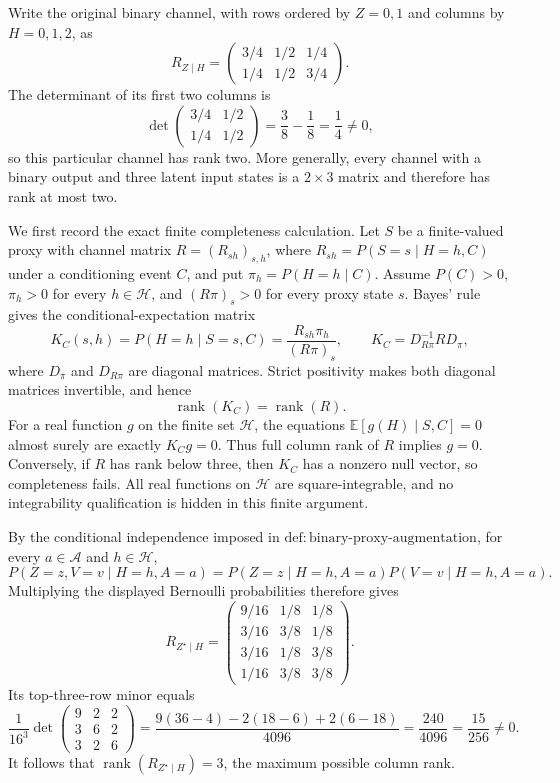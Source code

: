 Write the original binary channel, with rows ordered by \(Z=0,1\) and columns by \(H=0,1,2\), as
\[
 R_{Z\mid H}=
 \begin{pmatrix}
  3/4&1/2&1/4\\
  1/4&1/2&3/4
 \end{pmatrix}.
\]
The determinant of its first two columns is
\[
 \det\!\begin{pmatrix}3/4&1/2\\1/4&1/2\end{pmatrix}
 =\frac{3}{8}-\frac{1}{8}=\frac14\ne0,
\]
so this particular channel has rank two. More generally, every channel with a binary output and three latent input states is a \(2\times3\) matrix and therefore has rank at most two.

We first record the exact finite completeness calculation. Let \(S\) be a finite-valued proxy with channel matrix \(R=(R_{sh})_{s,h}\), where \(R_{sh}=P(S=s\mid H=h,C)\) under a conditioning event \(C\), and put \(\pi_h=P(H=h\mid C)\). Assume \(P(C)>0\), \(\pi_h>0\) for every \(h\in\mathcal H\), and \((R\pi)_s>0\) for every proxy state \(s\). Bayes' rule gives the conditional-expectation matrix
\[
 K_C(s,h)=P(H=h\mid S=s,C)
 =\frac{R_{sh}\pi_h}{(R\pi)_s},
 \qquad
 K_C=D_{R\pi}^{-1}R D_{\pi},
\]
where \(D_{\pi}\) and \(D_{R\pi}\) are diagonal matrices. Strict positivity makes both diagonal matrices invertible, and hence
\[
 \operatorname{rank}(K_C)=\operatorname{rank}(R).
\]
For a real function \(g\) on the finite set \(\mathcal H\), the equations \(\mathbb E[g(H)\mid S,C]=0\) almost surely are exactly \(K_Cg=0\). Thus full column rank of \(R\) implies \(g=0\). Conversely, if \(R\) has rank below three, then \(K_C\) has a nonzero null vector, so completeness fails. All real functions on \(\mathcal H\) are square-integrable, and no integrability qualification is hidden in this finite argument.

By the conditional independence imposed in \(\mathrm{def{:}binary\text{-}proxy\text{-}augmentation}\), for every \(a\in\mathcal A\) and \(h\in\mathcal H\),
\[
 P(Z=z,V=v\mid H=h,A=a)
 =P(Z=z\mid H=h,A=a)P(V=v\mid H=h,A=a).
\]
Multiplying the displayed Bernoulli probabilities therefore gives
\[
 R_{Z^{\star}\mid H}=
 \begin{pmatrix}
  9/16&1/8&1/8\\
  3/16&3/8&1/8\\
  3/16&1/8&3/8\\
  1/16&3/8&3/8
 \end{pmatrix}.
\]
Its top-three-row minor equals
\[
 \frac{1}{16^3}
 \det\!\begin{pmatrix}9&2&2\\3&6&2\\3&2&6\end{pmatrix}
 =\frac{9(36-4)-2(18-6)+2(6-18)}{4096}
 =\frac{240}{4096}=\frac{15}{256}\ne0.
\]
It follows that \(\operatorname{rank}(R_{Z^{\star}\mid H})=3\), the maximum possible column rank.

